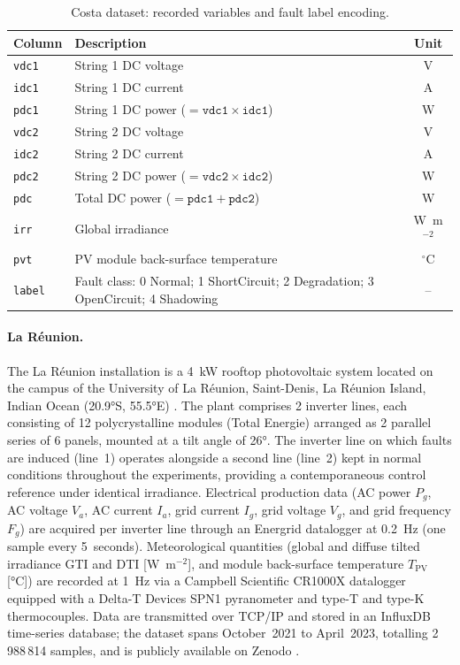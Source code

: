 \begin{table}[H]
\centering
\caption{Costa dataset: recorded variables and fault label encoding.}
\label{tab:costa-vars}
\begin{tabular}{l p{7.5cm} c}
\toprule
\textbf{Column} & \textbf{Description} & \textbf{Unit} \\
\midrule
\texttt{vdc1} & String 1 DC voltage & V \\
\texttt{idc1} & String 1 DC current & A \\
\texttt{pdc1} & String 1 DC power ($= \mathtt{vdc1} \times \mathtt{idc1}$) & W \\
\texttt{vdc2} & String 2 DC voltage & V \\
\texttt{idc2} & String 2 DC current & A \\
\texttt{pdc2} & String 2 DC power ($= \mathtt{vdc2} \times \mathtt{idc2}$) & W \\
\texttt{pdc}  & Total DC power ($= \mathtt{pdc1} + \mathtt{pdc2}$) & W \\
\texttt{irr}  & Global irradiance & W~m$^{-2}$ \\
\texttt{pvt}  & PV module back-surface temperature & $^\circ$C \\
\texttt{label} & Fault class: 0 Normal; 1 ShortCircuit; 2 Degradation; 3 OpenCircuit; 4 Shadowing & -- \\
\bottomrule
\end{tabular}
\end{table}

\newpage
\paragraph{La Réunion.}
The La Réunion installation is a 4~kW rooftop photovoltaic system located on the campus of the University of La Réunion, Saint-Denis, La Réunion Island, Indian Ocean (20.9°S, 55.5°E) \citep{graillet2023dib}. The plant comprises 2 inverter lines, each consisting of 12 polycrystalline modules (Total Energie) arranged as 2 parallel series of 6 panels, mounted at a tilt angle of 26°. The inverter line on which faults are induced (line~1) operates alongside a second line (line~2) kept in normal conditions throughout the experiments, providing a contemporaneous control reference under identical irradiance. Electrical production data (AC power $P_g$, AC voltage $V_a$, AC current $I_a$, grid current $I_g$, grid voltage $V_g$, and grid frequency $F_g$) are acquired per inverter line through an Energrid datalogger at 0.2~Hz (one sample every 5~seconds). Meteorological quantities (global and diffuse tilted irradiance GTI and DTI [W~m$^{-2}$], and module back-surface temperature $T_{\mathrm{PV}}$ [°C]) are recorded at 1~Hz via a Campbell Scientific CR1000X datalogger equipped with a Delta-T Devices SPN1 pyranometer and type-T and type-K thermocouples. Data are transmitted over TCP/IP and stored in an InfluxDB time-series database; the dataset spans October~2021 to April~2023, totalling 2\,988\,814 samples, and is publicly available on Zenodo \citep{graillet2023dib}.

